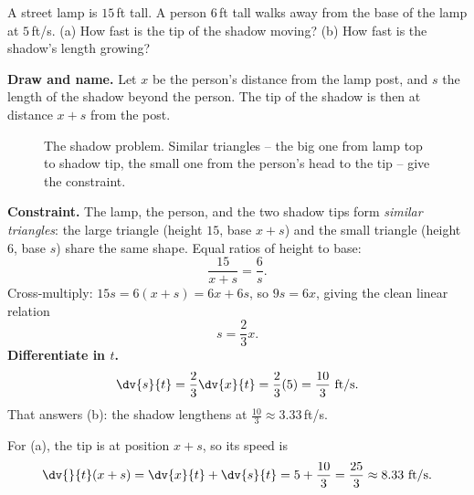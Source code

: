 \begin{example}
\label{ch13:ex-shadow}
A street lamp is $15$\,ft tall. A person $6$\,ft tall walks away from the base of the lamp at
$5$\,ft/s. (a) How fast is the tip of the shadow moving? (b) How fast is the shadow's length growing?

\textbf{Draw and name.} Let $x$ be the person's distance from the lamp post, and $s$ the length of
the shadow beyond the person. The tip of the shadow is then at distance $x+s$ from the post.

\begin{figure}[H]
\centering
{}
\caption{The shadow problem. Similar triangles -- the big one from lamp top to shadow tip, the small
one from the person's head to the tip -- give the constraint.}
\label{ch13:fig-shadow}
\end{figure}

\textbf{Constraint.} The lamp, the person, and the two shadow tips form \emph{similar triangles}: the
large triangle (height $15$, base $x+s$) and the small triangle (height $6$, base $s$) share the same
shape. Equal ratios of height to base:
\[
\frac{15}{x+s} = \frac{6}{s}.
\]
Cross-multiply: $15 s = 6(x+s) = 6x + 6s$, so $9s = 6x$, giving the clean linear relation
\[
s = \frac{2}{3}x.
\]
\textbf{Differentiate in $t$.}
\[
\dv{s}{t} = \frac{2}{3}\dv{x}{t} = \frac{2}{3}(5) = \frac{10}{3}\ \text{ft/s}.
\]
That answers (b): the shadow lengthens at $\tfrac{10}{3}\approx 3.33$\,ft/s.

For (a), the tip is at position $x+s$, so its speed is
\[
\dv{}{t}(x+s) = \dv{x}{t} + \dv{s}{t} = 5 + \frac{10}{3} = \frac{25}{3}\approx 8.33\ \text{ft/s}.
\]
\end{example}

